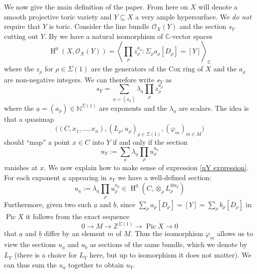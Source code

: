 \documentclass[11pt]{amsart}
\newcommand{\Z}{\mathbb{Z}}
\newcommand{\N}{\mathbb{N}}
\newcommand{\OO}{\mathcal{O}}
\renewcommand{\to}{\rightarrow}
\newcommand{\Pic}{\operatorname{Pic}}
\newcommand{\CC}{\mathbb{C}}
\newcommand{\HH}{\operatorname{H}}
\theoremstyle{definition}
\theoremstyle{definition}
\begin{document}
We now give the main definition of the paper. From here on $X$ will denote a smooth projective toric variety and $Y \subseteq X$ a very ample hypersurface. We \emph{do not} require that $Y$ is toric.
Consider the line bundle $\OO_X(Y)$ and the section $s_Y$ cutting out $Y$. By \cite{CoxRing} we have a natural isomorphism of $\CC$-vector spaces
\begin{equation*} \HH^0(X,\OO_X(Y)) = \left\langle \prod_{\rho} z_\rho^{a_\rho} : \Sigma_\rho a_\rho [D_\rho] = [Y] \right\rangle_{\CC} \end{equation*}
where the $z_\rho$ for $\rho \in \Sigma(1)$ are the generators of the Cox ring of $X$ and the $a_\rho$ are non-negative integers. We can therefore write $s_Y$ as
\begin{equation*} s_Y = \sum_{\underline{a}=(a_\rho)} \lambda_{\underline{a}} \prod_\rho z_\rho^{a_\rho} \end{equation*}
where the $\underline{a} = (a_\rho) \in \N^{\Sigma(1)}$ are exponents and the $\lambda_{\underline{a}}$ are scalars. The idea is that a quasimap
\begin{equation*} \big((C,x_1,\ldots,x_n), (L_\rho,u_\rho)_{\rho \in \Sigma(1)}, (\varphi_m)_{m \in M}\big) \end{equation*}
should ``map'' a point $x \in C$ into $Y$ if and only if the section
\begin{equation} \label{uY expression} u_Y := \sum_{\underline{a}} \lambda_{\underline{a}} \prod_\rho u_\rho^{a_\rho} \end{equation}
vanishes at $x$. We now explain how to make sense of expression \eqref{uY expression}. For each exponent $\underline{a}$ appearing in $s_Y$ we have a well-defined section:
\begin{equation*} u_{\underline{a}} := \lambda_{\underline{a}} \prod_\rho u_\rho^{a_\rho} \in \HH^0(C,\otimes_\rho L_\rho^{\otimes a_\rho}) \end{equation*}
Furthermore, given two such $\underline{a}$ and $\underline{b}$, since $\sum_\rho a_\rho [D_\rho] = [Y] = \sum_\rho b_\rho [D_\rho]$ in $\Pic{X}$ it follows from the exact sequence
\begin{equation*} 0 \to M \to \Z^{\Sigma(1)} \to \Pic{X} \to 0 \end{equation*}
that $\underline{a}$ and $\underline{b}$ differ by an element $m$ of $M$. Thus the isomorphism $\varphi_m$ allows us to view the sections $u_{\underline{a}}$ and $u_{\underline{b}}$ as sections of the same bundle, which we denote by $L_Y$ (there is a choice for $L_Y$ here, but up to isomorphism it does not matter). We can thus sum the $u_{\underline{a}}$ together to obtain $u_Y$.
\end{document}
